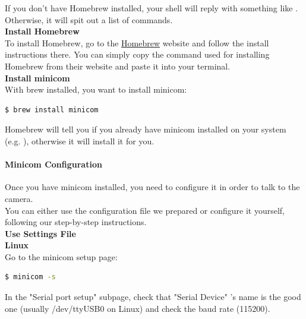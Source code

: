 If you don't have Homebrew installed, your shell will reply with something like . Otherwise, it will spit out a list of  commands.\\ 

\textbf{Install Homebrew}\\

To install Homebrew, go to the \href{https://brew.sh/}{Homebrew} website and follow the install instructions there. You can simply copy the command used for installing Homebrew from their website and paste it into your terminal.\\

\textbf{Install minicom}\\

With brew installed, you want to install minicom:

\begin{lstlisting}[language=bash,morekeywords=$,keywordstyle=\bfseries,frame=none,xleftmargin=.25in,belowskip=2em, aboveskip=2em]
$ brew install minicom
\end{lstlisting}

Homebrew will tell you if you already have minicom installed on your system (e.g. ), otherwise it will install it for you. 


\paragraph{Minicom Configuration}

Once you have minicom installed, you need to configure it in order to talk to the camera.\\

You can either use the configuration file we prepared or configure it yourself, following our step-by-step instructions. \\

\textbf{Use Settings File}\\

\textbf{Linux}\\

Go to the minicom setup page:

\begin{lstlisting}[language=bash,morekeywords=$,keywordstyle=\bfseries,frame=none,xleftmargin=.25in,belowskip=2em, aboveskip=2em]
$ minicom -s
\end{lstlisting}

In the "Serial port setup" subpage, check that "Serial Device" 's name is the good one (usually /dev/ttyUSB0 on Linux) and check the baud rate (115200).\\

